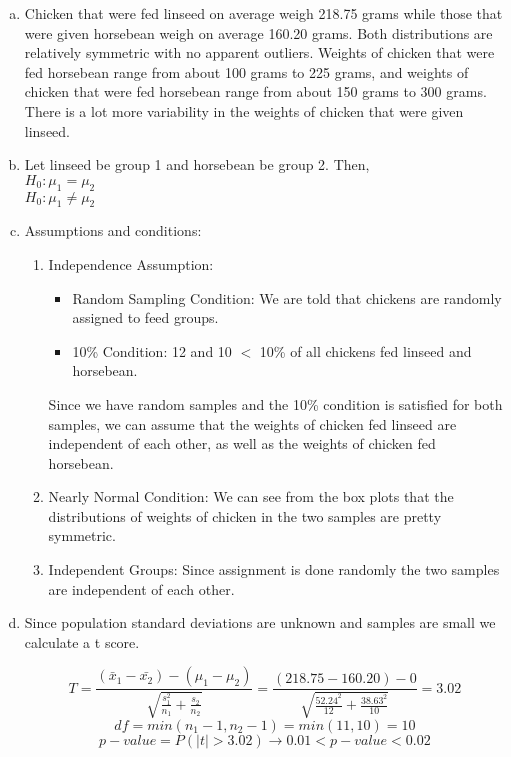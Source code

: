 {
\begin{enumerate}[(a)]
\setlength{\itemsep}{0mm}

\item Chicken that were fed linseed on average weigh 218.75 grams while those that were given horsebean weigh on average 160.20 grams. Both distributions are relatively symmetric with no apparent outliers. Weights of chicken that were fed horsebean range from about 100 grams to 225 grams, and weights of chicken that were fed horsebean range from about 150 grams to 300 grams. There is a lot more variability in the weights of chicken that were given linseed.

\item Let linseed be group 1 and horsebean be group 2. Then,\\
$H_0: \mu_1 = \mu_2$ \\
$H_0: \mu_1 \ne \mu_2$ \\

\item Assumptions and conditions:
\begin{enumerate}[1.]
\item Independence Assumption: 
\begin{itemize}
\item Random Sampling Condition: We are told that chickens are randomly assigned to feed groups.
\item 10\% Condition: 12 and 10 $<$ 10\% of all chickens fed linseed and horsebean.
\end{itemize}
Since we have random samples and the 10\% condition is satisfied for both samples, we can assume that the weights of chicken fed linseed  are independent of each other, as well as the weights of chicken fed horsebean.
\item Nearly Normal Condition: We can see from the box plots that the distributions of weights of chicken in the two samples are pretty symmetric.
\item Independent Groups: Since assignment is done randomly the two samples are independent of each other.
\end{enumerate}

\item Since population standard deviations are unknown and samples are small we calculate a t score.

\[ T = \frac{(\bar{x}_1 - \bar{x_2}) - (\mu_1 - \mu_2)}{\sqrt{ \frac{s_1^2}{n_1} + \frac{s_2}{n_2} }} = \frac{(218.75 - 160.20) - 0}{ \sqrt{\frac{52.24^2}{12} + \frac{38.63^2}{10}} } = 3.02 \]
\[ df = min(n_1 - 1,  n_2 - 1) = min(11,10) = 10 \]
\[ p-value = P(|t| > 3.02) \rightarrow 0.01 < p-value < 0.02  \]


\end{enumerate}}
